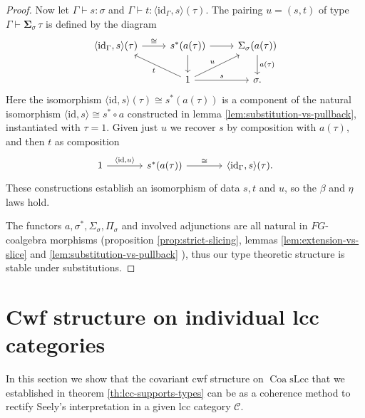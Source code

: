 \documentclass[a4paper]{article}
\theoremstyle{remark}
\theoremstyle{definition}
\begin{document}
\begin{proof}
  Now let $\Gamma \vdash s : \sigma$ and $\Gamma \vdash t : \langle \mathrm{id}_\Gamma, s \rangle(\tau)$.
  The pairing $u = (s, t)$ of type $\Gamma \vdash \mathbf{\Sigma}_\sigma \, \tau$ is defined by the diagram
  \begin{equation}
    \begin{tikzcd}
      \langle \mathrm{id}_\Gamma, s \rangle(\tau) \arrow[r, "\cong"] & s^*(a(\tau)) \arrow[r] \arrow[d] & \Sigma_\sigma(a(\tau)) \arrow[d, "a(\tau)"] \\
      & 1 \arrow[ul, "t"] \arrow[r, "s"] \arrow[ur, "u"] & \sigma.
    \end{tikzcd}
  \end{equation}
  Here the isomorphism $\langle \mathrm{id}, s \rangle(\tau) \cong s^*(a(\tau))$ is a component of the natural isomorphism $\langle \mathrm{id}, s \rangle \cong s^* \circ a$ constructed in lemma \ref{lem:substitution-vs-pullback}, instantiated with $\tau = 1$.
  Given just $u$ we recover $s$ by composition with $a(\tau)$, and then $t$ as composition
  \begin{equation}
    \begin{tikzcd}[column sep=large]
      1 \arrow[r, "{\langle \mathrm{id}, u \rangle}"] & s^*(a(\tau)) \arrow[r, "\cong"] & \langle \mathrm{id}_\Gamma, s \rangle(\tau).
    \end{tikzcd}
  \end{equation}
  These constructions establish an isomorphism of data $s, t$ and $u$, so the $\beta$ and $\eta$ laws hold.

  The functors $a, \sigma^*, \Sigma_\sigma, \Pi_\sigma$ and involved adjunctions are all natural in $FG$-coalgebra morphisms (proposition \ref{prop:strict-slicing}, lemmas \ref{lem:extension-vs-slice} and \ref{lem:substitution-vs-pullback} ), thus our type theoretic structure is stable under substitutions.
\end{proof}

\section{Cwf structure on individual lcc categories}
\label{sec:applications}

In this section we show that the covariant cwf structure on $\operatorname{Coa} \mathrm{sLcc}$ that we established in theorem \ref{th:lcc-supports-types} can be as a coherence method to rectify Seely's interpretation in a given lcc category $\mathcal{C}$.
\end{document}
